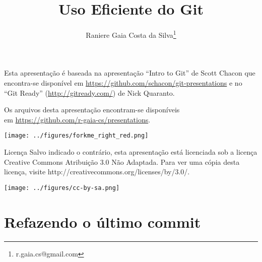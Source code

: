\documentclass[11pt]{beamer}
\begin{document}
\title{Uso Eficiente do Git}
\author[Raniere Silva]{Raniere Gaia Costa da
Silva\footnote{r.gaia.cs@gmail.com}}

\begin{frame}
    \maketitle
\end{frame}

\begin{frame}
    Esta apresentação é baseada na apresentação ``Intro to Git'' de Scott
    Chacon que encontra-se disponível em
    \url{https://github.com/schacon/git-presentations} e no ``Git Ready''
    (\url{http://gitready.com/}) de Nick Quaranto.

    \begin{block}{}
        Os arquivos desta apresentação encontram-se disponíveis \\
        em \url{https://github.com/r-gaia-cs/presentations}. \\
        \vspace{-33pt}
        \begin{flushright}
            \texttt{[image: ../figures/forkme\_right\_red.png]}
        \end{flushright}
    \end{block}

    \begin{block}{Licença}
        Salvo indicado o contrário, esta apresentação está licenciada sob a licença
        Creative Commons Atribuição 3.0 Não Adaptada. Para ver uma cópia desta
        licença, visite http://creativecommons.org/licenses/by/3.0/.
        \begin{center}
            \texttt{[image: ../figures/cc-by-sa.png]}
        \end{center}
    \end{block}
\end{frame}

\begin{frame}
    \tableofcontents
\end{frame}

\section{Refazendo o último commit}
\end{document}
